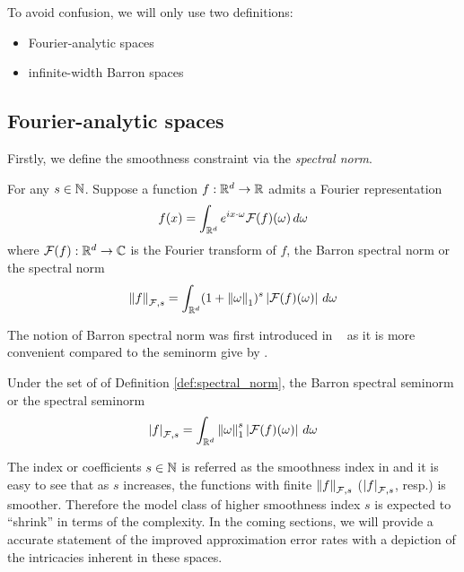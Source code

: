 To avoid confusion, we will only use two definitions:
\begin{itemize}
    \item Fourier-analytic spaces
    \item infinite-width Barron spaces
\end{itemize}

\subsection{Fourier-analytic spaces}

Firstly, we define the smoothness constraint via the \textit{spectral norm}.

\begin{definition}
    \label{def:spectral_norm}
    For any $s \in \mathbb{N}$. Suppose a function $f: \mathbb{R}^d \to \mathbb{R}$ admits a Fourier
    representation
    \begin{equation}
        f(x) = \int_{\mathbb{R}^d} e^{ix \cdot \omega} \mathcal{F}(f)(\omega) \,d\omega
    \end{equation}
    where $\mathcal{F}(f): \mathbb{R}^d \to \mathbb{C}$ is the Fourier transform of $f$,
    the Barron spectral norm or the spectral norm
    \begin{equation}
        \left\| f \right\|_{\mathcal{F}, {s}} = \int_{\mathbb{R}^d} (1+\left\| \omega \right\|_1)^s \left| \mathcal{F}(f)(\omega) \right|
            \,d\omega
    \end{equation}
\end{definition}

The notion of Barron spectral norm was first introduced in
~\cite{siegelApproximationRatesNeural2021} as it is more convenient compared to
the seminorm give by \cite{barronUniversalApproximationBounds1993}.

\begin{definition}
    \label{def:spectral_seminorm}
    Under the set of of Definition \ref{def:spectral_norm}, the Barron spectral
    seminorm or the spectral seminorm
    \begin{equation}
        \left| f \right|_{\mathcal{F}, {s}} = \int_{\mathbb{R}^d} \left\| \omega \right\|_1^s \left| \mathcal{F}(f)(\omega) \right|
            \,d\omega 
    \end{equation}
\end{definition}

The index or coefficients $s \in \mathbb{N}$ is referred as the smoothness index in
\cite{siegelHighOrderApproximationRates2021} and it is easy to see that as $s$
increases, the functions with finite $\left\| f \right\|_{\mathcal{F}, {s}}$ ($\left| f \right|_{\mathcal{F}, {s}}$,
resp.) is smoother. Therefore the model class of higher smoothness index $s$ is
expected to ``shrink'' in terms of the complexity. In the coming sections, we
will provide a accurate statement of the improved approximation error rates with
a depiction of the intricacies inherent in these spaces.


